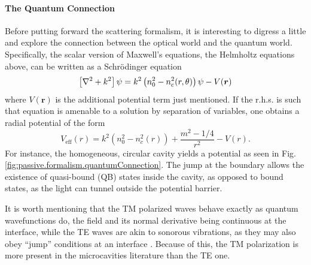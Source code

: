 \paragraph{The Quantum Connection}
Before putting forward the scattering formalism, it is interesting
to digress a little and explore the connection between the optical 
world and the quantum world. Specifically, the scalar version of
Maxwell's equations, the Helmholtz equations above, can be written 
as a Schrödinger equation
	\begin{equation}
		\left[\nabla^2+k^2\right]\psi = k^2\left(n_0^2-n_c^2(r,\theta)\right)\psi - V(\boldsymbol{r})
	\end{equation}
where $V(\boldsymbol{r})$  is the additional potential term just mentioned.
If the r.h.s. is such that equation is amenable to a solution by 
separation of variables, one obtains a radial potential of the form
	\begin{equation}
		V_\text{eff}(r) = k^2(n_0^2-n_c^2(r))+\frac{m^2-1/4}{r^2}-V(r).
	\end{equation}
For instance, the homogeneous, circular cavity yields a
potential as seen in Fig. \ref{fig:passive.formalism.quantumConnection}. 
The jump at the boundary allows the existence of quasi-bound (QB) states inside
the cavity, as opposed to bound states, as the light can tunnel outside the
potential barrier.

It is worth mentioning that the TM polarized waves behave exactly as 
quantum wavefunctions do, the field and its normal derivative being
continuous at the interface, while the TE waves are akin to 
sonorous vibrations, as they may also obey ``jump'' conditions
at an interface \cite{COL2013}. Because of this, the TM polarization
is more present in the microcavities literature than the TE one.

